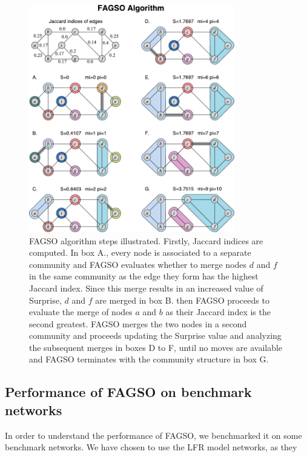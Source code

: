 \begin{figure}
\centering
\includegraphics[width=0.8\textwidth]{images/fagso.pdf}
\caption{FAGSO algorithm steps illustrated. Firstly, Jaccard indices are computed. In box A., every node is associated to a separate community and FAGSO evaluates whether to merge nodes $d$ and $f$ in the same community as the edge they form has the highest Jaccard index. Since this merge results in an increased value of Surprise, $d$ and $f$ are merged in box B. then FAGSO proceeds to evaluate the merge of nodes $a$ and $b$ as their Jaccard index is the second greatest. FAGSO merges the two nodes in a second community and proceeds updating the Surprise value and analyzing the subsequent merges in boxes D to F, until no moves are available and FAGSO terminates with the community structure in box G.}
\label{fig:fagso_working}
\end{figure}

\subsection{Performance of FAGSO on benchmark networks}
In order to understand the performance of FAGSO, we benchmarked it on some benchmark networks. We have chosen to use the LFR model networks, as they 

